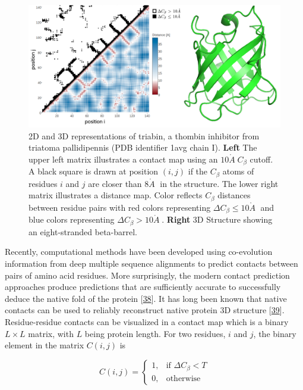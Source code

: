 \documentclass[11pt,a4paper,twoside]{book}
\newcommand{\Cb}{C_\beta}
\newcommand{\angstrom}{\mathring{A} \;}
\theoremstyle{definition}
\theoremstyle{definition}
\theoremstyle{remark}
\begin{document}
\begin{figure}

{\centering \includegraphics[width=1\linewidth]{img/intro/contat_map_and_structure_1avgi00} 

}

\caption{2D and 3D representations of triabin, a
thombin inhibitor from triatoma pallidipennis (PDB identifier 1avg chain
I). \textbf{Left} The upper left matrix illustrates a contact map using
an \(10 \angstrom \Cb\) cutoff. A black square is drawn at position
\((i, j)\) if the \(\Cb\) atoms of residues \(i\) and \(j\) are closer
than \(8 \angstrom\) in the structure. The lower right matrix
illustrates a distance map. Color reflects \(\Cb\) distances between
residue pairs with red colors representing
\(\Delta \Cb \le 10 \angstrom\) and blue colors representing
\(\Delta \Cb > 10 \angstrom\). \textbf{Right} 3D Structure showing an
eight-stranded beta-barrel.}\label{fig:contact-map}
\end{figure}

Recently, computational methods have been developed using co-evolution
information from deep multiple sequence alignments to predict contacts
between pairs of amino acid residues. More surprisingly, the modern
contact prediction approaches produce predictions that are sufficiently
accurate to successfully deduce the native fold of the protein
{[}\protect\hyperlink{ref-Marks2011}{38}{]}. It has long been known that
native contacts can be used to reliably reconstruct native protein 3D
structure {[}\protect\hyperlink{ref-Vendruscolo1997}{39}{]}.
Residue-residue contacts can be visualized in a contact map which is a
binary \(L \times L\) matrix, with \(L\) being protein length. For two
residues, \(i\) and \(j\), the binary element in the matrix \(C(i,j)\)
is

\begin{equation}
    C(i,j) =    
    \begin{cases}
        1, & \text{if } \Delta \Cb < T \\
        0, & \text{otherwise}
    \end{cases}
\end{equation}
\end{document}
